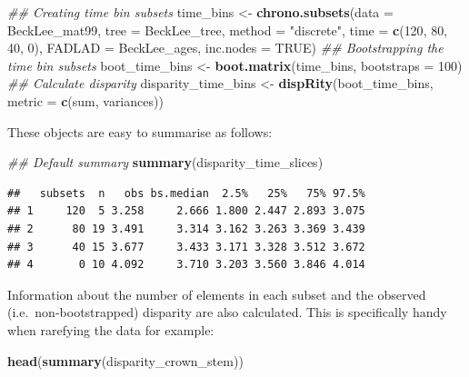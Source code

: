 \documentclass[]{book}
\newenvironment{Shaded}{\begin{snugshade}}{\end{snugshade}}
\newcommand{\CommentTok}[1]{\textcolor[rgb]{0.56,0.35,0.01}{\textit{#1}}}
\newcommand{\DataTypeTok}[1]{\textcolor[rgb]{0.13,0.29,0.53}{#1}}
\newcommand{\DecValTok}[1]{\textcolor[rgb]{0.00,0.00,0.81}{#1}}
\newcommand{\KeywordTok}[1]{\textcolor[rgb]{0.13,0.29,0.53}{\textbf{#1}}}
\newcommand{\NormalTok}[1]{#1}
\newcommand{\OtherTok}[1]{\textcolor[rgb]{0.56,0.35,0.01}{#1}}
\newcommand{\StringTok}[1]{\textcolor[rgb]{0.31,0.60,0.02}{#1}}
\begin{document}
\begin{Shaded}
\begin{Highlighting}[]
\CommentTok{## Creating time bin subsets}
\NormalTok{time_bins <-}\StringTok{ }\KeywordTok{chrono.subsets}\NormalTok{(}\DataTypeTok{data =}\NormalTok{ BeckLee_mat99,}
                            \DataTypeTok{tree =}\NormalTok{ BeckLee_tree, }
                            \DataTypeTok{method =} \StringTok{"discrete"}\NormalTok{,}
                            \DataTypeTok{time =} \KeywordTok{c}\NormalTok{(}\DecValTok{120}\NormalTok{, }\DecValTok{80}\NormalTok{, }\DecValTok{40}\NormalTok{, }\DecValTok{0}\NormalTok{),}
                            \DataTypeTok{FADLAD =}\NormalTok{ BeckLee_ages,}
                            \DataTypeTok{inc.nodes =} \OtherTok{TRUE}\NormalTok{)}
\CommentTok{## Bootstrapping the time bin subsets}
\NormalTok{boot_time_bins <-}\StringTok{ }\KeywordTok{boot.matrix}\NormalTok{(time_bins, }\DataTypeTok{bootstraps =} \DecValTok{100}\NormalTok{)}
\CommentTok{## Calculate disparity}
\NormalTok{disparity_time_bins <-}\StringTok{ }\KeywordTok{dispRity}\NormalTok{(boot_time_bins,}
                                \DataTypeTok{metric =} \KeywordTok{c}\NormalTok{(sum, variances))}
\end{Highlighting}
\end{Shaded}

These objects are easy to summarise as follows:

\begin{Shaded}
\begin{Highlighting}[]
\CommentTok{## Default summary}
\KeywordTok{summary}\NormalTok{(disparity_time_slices)}
\end{Highlighting}
\end{Shaded}

\begin{verbatim}
##   subsets  n   obs bs.median  2.5%   25%   75% 97.5%
## 1     120  5 3.258     2.666 1.800 2.447 2.893 3.075
## 2      80 19 3.491     3.314 3.162 3.263 3.369 3.439
## 3      40 15 3.677     3.433 3.171 3.328 3.512 3.672
## 4       0 10 4.092     3.710 3.203 3.560 3.846 4.014
\end{verbatim}

Information about the number of elements in each subset and the observed (i.e.~non-bootstrapped) disparity are also calculated.
This is specifically handy when rarefying the data for example:

\begin{Shaded}
\begin{Highlighting}[]
\KeywordTok{head}\NormalTok{(}\KeywordTok{summary}\NormalTok{(disparity_crown_stem))}
\end{Highlighting}
\end{Shaded}
\end{document}
